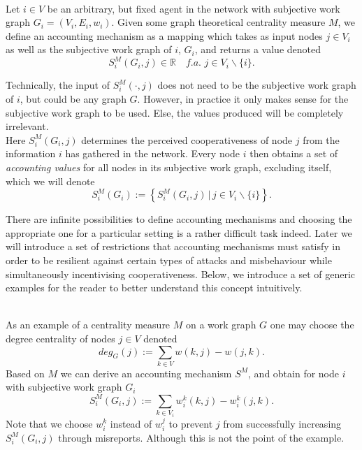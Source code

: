 \begin{definition}\ \\
\label{def:Accounting Mechanism}
\noindent{}Let $i\in{}V$ be an arbitrary, but fixed agent in the network with subjective work graph $G_i=(V_i,E_i,w_i)$. Given some graph theoretical centrality measure $M$, we define an accounting mechanism as a mapping which takes as input nodes $j\in{}V_i$ as well as the subjective work graph of $i$, $G_i$, and returns a value denoted 
\[
S^M_i(G_i,j) \in \mathbb{R}\quad\textit{f.a. }j\in{}V_i\backslash\lbrace{}i\rbrace.
\]

\noindent{}Technically, the input of $S^M_i(\cdot,j)$ does not need to be the subjective work graph of $i$, but could be any graph $G$. However, in practice it only makes sense for the subjective work graph to be used. Else, the values produced will be completely irrelevant.\vspace{1em}\\

\noindent{}Here $S^M_i(G_i,j)$ determines the perceived cooperativeness of node $j$ from the information $i$ has gathered in the network. Every node $i$ then obtains a set of {\it accounting values} for all nodes in its subjective work graph, excluding itself, which we will denote
\[
S^M_i(G_i):=\left\lbrace{}S^M_i(G_i,j)\,|\,j\in{}V_i\backslash\lbrace{}i\rbrace\right\rbrace.
\]
\end{definition}

\noindent{}There are infinite possibilities to define accounting mechanisms and choosing the appropriate one for a particular setting is a rather difficult task indeed. Later we will introduce a set of restrictions that accounting mechanisms must satisfy in order to be resilient against certain types of attacks and misbehaviour while simultaneously incentivising cooperativeness. Below, we introduce a set of generic examples for the reader to better understand this concept intuitively.\vspace{1em}\\

\begin{example}\ \\
\label{ex:Degree-based Accounting Mechanism}
\noindent{}As an example of a centrality measure $M$ on a work graph $G$ one may choose the degree centrality of nodes $j\in{}V$ denoted
\[
deg_{G}(j):=\sum\limits_{k\in{}V}w(k,j) - w(j,k).
\]
\noindent{}Based on $M$ we can derive an accounting mechanism $S^M$, and obtain for node $i$ with subjective work graph $G_i$
\[
S^M_i(G_i,j):=\sum\limits_{k\in{}V_i}w_i^k(k,j) - w_i^k(j,k).
\]
\noindent{}Note that we choose $w_i^k$ instead of $w_i^j$ to prevent $j$ from successfully increasing $S^M_i(G_i,j)$ through misreports. Although this is not the point of the example.\vspace{1em}\\
\end{example}

